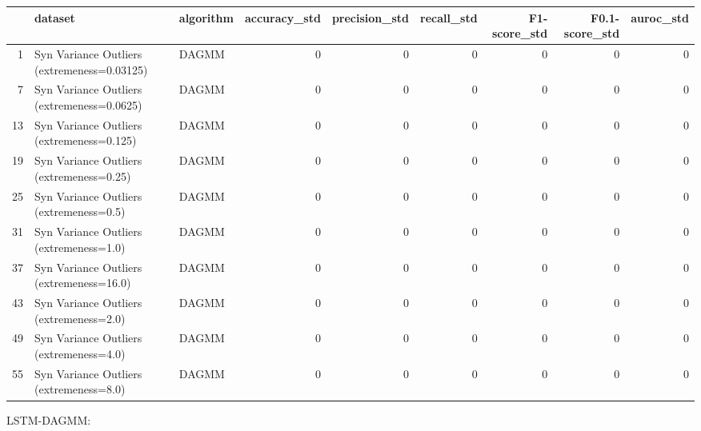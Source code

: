 \begin{tabular}{rllrrrrrr}
\hline
    & dataset                                     & algorithm   &   accuracy\_std &   precision\_std &   recall\_std &   F1-score\_std &   F0.1-score\_std &   auroc\_std \\
\hline
  1 & Syn Variance Outliers (extremeness=0.03125) & DAGMM       &              0 &               0 &            0 &              0 &                0 &           0 \\
  7 & Syn Variance Outliers (extremeness=0.0625)  & DAGMM       &              0 &               0 &            0 &              0 &                0 &           0 \\
 13 & Syn Variance Outliers (extremeness=0.125)   & DAGMM       &              0 &               0 &            0 &              0 &                0 &           0 \\
 19 & Syn Variance Outliers (extremeness=0.25)    & DAGMM       &              0 &               0 &            0 &              0 &                0 &           0 \\
 25 & Syn Variance Outliers (extremeness=0.5)     & DAGMM       &              0 &               0 &            0 &              0 &                0 &           0 \\
 31 & Syn Variance Outliers (extremeness=1.0)     & DAGMM       &              0 &               0 &            0 &              0 &                0 &           0 \\
 37 & Syn Variance Outliers (extremeness=16.0)    & DAGMM       &              0 &               0 &            0 &              0 &                0 &           0 \\
 43 & Syn Variance Outliers (extremeness=2.0)     & DAGMM       &              0 &               0 &            0 &              0 &                0 &           0 \\
 49 & Syn Variance Outliers (extremeness=4.0)     & DAGMM       &              0 &               0 &            0 &              0 &                0 &           0 \\
 55 & Syn Variance Outliers (extremeness=8.0)     & DAGMM       &              0 &               0 &            0 &              0 &                0 &           0 \\
\hline
\end{tabular}

LSTM-DAGMM:

